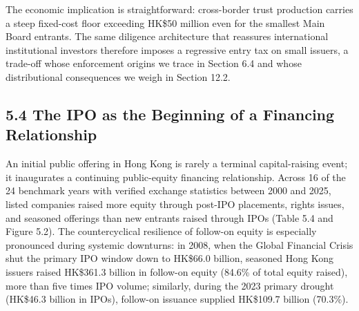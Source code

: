 \documentclass[11pt,letterpaper]{article}
\begin{document}
The economic implication is straightforward: cross-border trust production carries a steep fixed-cost floor exceeding HK\$50 million even for the smallest Main Board entrants. The same diligence architecture that reassures international institutional investors therefore imposes a regressive entry tax on small issuers, a trade-off whose enforcement origins we trace in Section 6.4 and whose distributional consequences we weigh in Section 12.2.

\subsection*{\texorpdfstring{5.4 The IPO as the Beginning of a Financing Relationship}{5.4 The IPO as the Beginning of a Financing Relationship}}
An initial public offering in Hong Kong is rarely a terminal capital-raising event; it inaugurates a continuing public-equity financing relationship. Across 16 of the 24 benchmark years with verified exchange statistics between 2000 and 2025, listed companies raised more equity through post-IPO placements, rights issues, and seasoned offerings than new entrants raised through IPOs (Table 5.4 and Figure 5.2). The countercyclical resilience of follow-on equity is especially pronounced during systemic downturns: in 2008, when the Global Financial Crisis shut the primary IPO window down to HK\$66.0 billion, seasoned Hong Kong issuers raised HK\$361.3 billion in follow-on equity (84.6\% of total equity raised), more than five times IPO volume; similarly, during the 2023 primary drought (HK\$46.3 billion in IPOs), follow-on issuance supplied HK\$109.7 billion (70.3\%).
\end{document}
